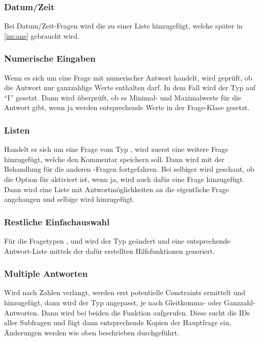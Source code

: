 \subsubsection{Datum/Zeit}
Bei Datum/Zeit-Fragen wird die  zu einer Liste hinzugefügt, welche später in \cref{im:ans} gebraucht wird.

\subsubsection{Numerische Eingaben}
Wenn es sich um eine Frage mit numerischer Antwort handelt, wird geprüft, ob die Antwort nur ganzzahlige Werte enthalten darf. In dem Fall wird der Typ auf \enquote{I} gesetzt. 
Dann wird überprüft, ob es Minimal- und Maximalwerte für die Antwort gibt, wenn ja werden entsprechende Werte in der Frage-Klase gesetzt.

\subsubsection{Listen}
Handelt es sich um eine Frage vom Typ , wird zuerst eine weitere Frage hinzugefügt, welche den Kommentar speichern soll.
Dann wird mit der Behandlung für die anderen -Fragen fortgefahren.
Bei selbiger wird geschaut, ob die Option für  aktiviert ist, wenn ja, wird auch dafür eine Frage hinzugefügt.
Dann wird eine Liste mit Antwortmöglichkeiten an die eigentliche Frage angehangen und selbige wird hinzugefügt.

\subsubsection{Restliche Einfachauswahl}
Für die Fragetypen ,  und  wird der Typ geändert und eine entsprechende Antwort-Liste mittels der dafür erstellten Hilfsfunktionen generiert.

\subsubsection{Multiple Antworten}

Wird nach Zahlen verlangt, werden erst potentielle Constraints ermittelt und hinzugefügt, dann wird der Typ angepasst, je nach Gleitkomma- oder Ganzzahl-Antworten.
Dann wird bei beiden die Funktion  aufgerufen.
Diese sucht die IDs aller Subfragen und fügt dann entsprechende Kopien der Hauptfrage ein, Änderungen werden wie oben beschrieben durchgeführt.

